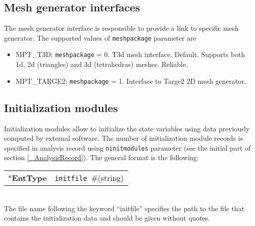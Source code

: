 \documentclass[a4paper]{article}
\makeatletter
\newcommand{\param}[1]{\texttt{#1}} %
\newcommand{\field}[2]{\param{#1}~\#{\tiny(#2)}} %
\newcommand{\entKeyword}[1]{*\textbf{#1}} %
\newenvironment{record}[1][]{\begin{tabular}{|ll}}{\end{tabular}\\}
\newcommand{\recentry}[2]{{#1}&{#2}\\}
\newcounter{rcc}
\newenvironment{record}[1][\textwidth]{\setcounter{rcc}{0}\begin{tabular*}{#1}{|ll@{\extracolsep{\fill}}r}}{\end{tabular*}\\}
\newcommand{\recentry}[2]{\ifthenelse{\value{rcc}>0}{&$\backslash$ \\}{\setcounter{rcc}{1}}{#1}&{#2}}
\makeatother
\begin{document}
\subsection{Mesh generator interfaces}
\label{meshpackages}
The mesh generator interface is responsible to provide a link to
specific mesh generator. The supported values of \param{meshpackage}
parameter are
\begin{itemize}
\item
MPT\_T3D:  \param{meshpackage} = 0. T3d mesh interface. Default. Supports both 1d, 2d
(triangles) and 3d (tetrahedras) meshes. Reliable.
\item
MPT\_TARGE2:	\param{meshpackage} = 1. Interface to Targe2 2D
mesh generator.
\end{itemize}
%
\subsection{Initialization modules}
\label{InitModulesSec}
Initialization modules allow to initialize the state variables using data 
previously computed by external software. The number of initialization module records is specified in
analysis record using \param{ninitmodules} parameter (see the initial part of section \ref{_AnalysisRecord}). The general format
is the following:\\
\begin{record}
  \recentry{\entKeyword{EntType}}{\field{initfile}{string}}
\end{record}
The file name following the keyword ``initfile'' specifies
the path to the file that contains the initialization data
and should be given without quotes.
\end{document}
